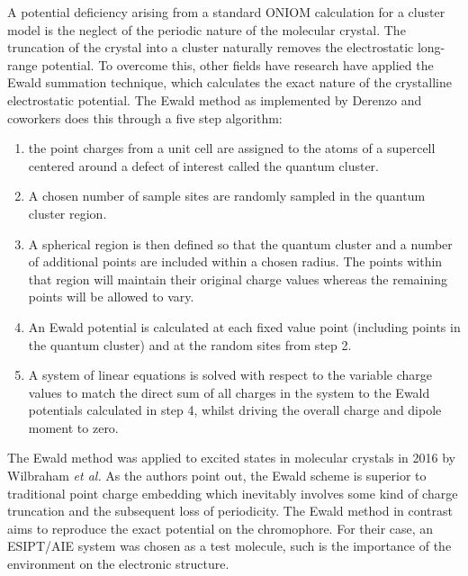 A potential deficiency arising from a standard ONIOM calculation for a cluster model is the neglect of the periodic nature of the molecular crystal. The truncation of the crystal into a cluster naturally removes the electrostatic long-range potential. To overcome this, other fields have research have applied the Ewald summation technique, which calculates the exact nature of the crystalline electrostatic potential.\cite{Weber2010,Stueber2001b} The Ewald method as implemented by Derenzo and coworkers does this through a five step algorithm:\cite{Klintenberg2000,Derenzo2000}  
\begin{enumerate}
    \item the point charges from a unit cell are assigned to the atoms of a supercell centered around a defect of interest called the quantum cluster.
    \item A chosen number of sample sites are randomly sampled in the quantum cluster region.
    \item A spherical region is then defined so that the quantum cluster and a number of additional points are included within a chosen radius. The points within that region will maintain their original charge values whereas the remaining points will be allowed to vary.
    \item An Ewald potential is calculated at each fixed value point (including points in the quantum cluster) and at the random sites from step 2.
    \item A system of linear equations is solved with respect to the variable charge values to match the direct sum of all charges in the system to the Ewald potentials calculated in step 4, whilst driving the overall charge and dipole moment to zero.
\end{enumerate}
The Ewald method was applied to excited states in molecular crystals in 2016 by Wilbraham \textit{et al.}\cite{Wilbraham2016} As the authors point out, the Ewald scheme is superior to traditional point charge embedding which inevitably involves some kind of charge truncation and the subsequent loss of periodicity. The Ewald method in contrast aims to reproduce the exact potential on the chromophore. For their case, an ESIPT/AIE system was chosen as a test molecule, such is the importance of the environment on the electronic structure. 
